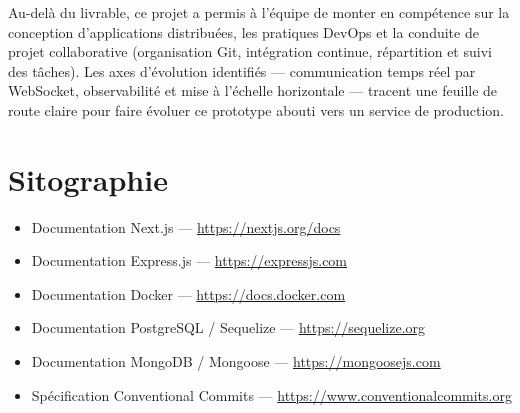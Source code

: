 \noindent Au-delà du livrable, ce projet a permis à l'équipe de monter en compétence sur la
conception d'applications distribuées, les pratiques DevOps et la conduite de
projet collaborative (organisation Git, intégration continue, répartition et suivi
des tâches). Les axes d'évolution identifiés — communication temps réel par
WebSocket, observabilité et mise à l'échelle horizontale — tracent une feuille de
route claire pour faire évoluer ce prototype abouti vers un service de production.

\newpage
\section*{Sitographie}

\begin{itemize}[leftmargin=1.4em]
  \item Documentation Next.js — \url{https://nextjs.org/docs}
  \item Documentation Express.js — \url{https://expressjs.com}
  \item Documentation Docker — \url{https://docs.docker.com}
  \item Documentation PostgreSQL / Sequelize — \url{https://sequelize.org}
  \item Documentation MongoDB / Mongoose — \url{https://mongoosejs.com}
  \item Spécification Conventional Commits — \url{https://www.conventionalcommits.org}
\end{itemize}
